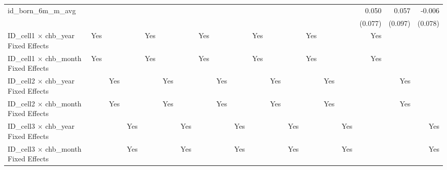 \begin{tabular}{lrrrrrrrrrrrrrrrrrr}
id\_born\_6m\_m\_avg                        &             &             &             &             &             &             &             &             &             &             &             &             &             &             &             &       0.050 &       0.057 &      -0.006 \\ 
                                            &             &             &             &             &             &             &             &             &             &             &             &             &             &             &             &     (0.077) &     (0.097) &     (0.078) \\ 
\midrule
ID\_cell1 $\times$ chb\_year Fixed Effects  &         Yes &             &             &         Yes &             &             &         Yes &             &             &         Yes &             &             &         Yes &             &             &         Yes &             &             \\ 
ID\_cell1 $\times$ chb\_month Fixed Effects &         Yes &             &             &         Yes &             &             &         Yes &             &             &         Yes &             &             &         Yes &             &             &         Yes &             &             \\ 
ID\_cell2 $\times$ chb\_year Fixed Effects  &             &         Yes &             &             &         Yes &             &             &         Yes &             &             &         Yes &             &             &         Yes &             &             &         Yes &             \\ 
ID\_cell2 $\times$ chb\_month Fixed Effects &             &         Yes &             &             &         Yes &             &             &         Yes &             &             &         Yes &             &             &         Yes &             &             &         Yes &             \\ 
ID\_cell3 $\times$ chb\_year Fixed Effects  &             &             &         Yes &             &             &         Yes &             &             &         Yes &             &             &         Yes &             &             &         Yes &             &             &         Yes \\ 
ID\_cell3 $\times$ chb\_month Fixed Effects &             &             &         Yes &             &             &         Yes &             &             &         Yes &             &             &         Yes &             &             &         Yes &             &             &         Yes \\ 

\end{tabular}
